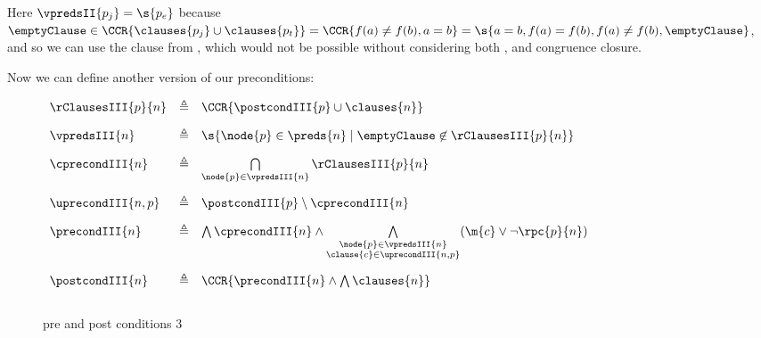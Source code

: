 Here $\vpredsII{p_j}=\s{p_e}$ because \\
$\emptyClause \in \CCR{\clauses{p_j} \cup \clauses{p_t}}=\CCR{f(a) \neq f(b),a=b} \\
=\s{a=b,f(a)=f(b),f(a) \neq f(b),\emptyClause}$,\\
 and so we can use the clause  from , which would not be possible without considering both ,  and congruence closure.



\noindent
Now we can define another version of our preconditions:
\begin{figure}[H]
$
\begin{array}{lll}
	\vspace{10pt}
	\rClausesIII{p}{n} & \triangleq & \CCR{\postcondIII{p} \cup \clauses{n}} \\
	\vspace{10pt}
	\vpredsIII{n}      & \triangleq & \s{\node{p} \in \preds{n} \mid  \emptyClause \not\in \rClausesIII{p}{n}} \\
	\vspace{10pt}
	\cprecondIII{n}   & \triangleq & \bigcap\limits_{\node{p} \in \vpredsIII{n}} \rClausesIII{p}{n} \\
	\vspace{10pt}
	\uprecondIII{n,p} & \triangleq & \postcondIII{p} \setminus \cprecondIII{n} \\
	\vspace{10pt}
	\precondIII{n}    & \triangleq & \bigwedge\cprecondIII{n} \wedge \bigwedge\limits_{\substack{\node{p} \in \vpredsIII{n}\\\clause{c} \in \uprecondIII{n,p}}} 
	(\m{c} \lor \lnot \rpc{p}{n})\\
	\vspace{10pt}
	\postcondIII{n} & \triangleq & \CCR{\precondIII{n} \land \bigwedge \clauses{n}}
\end{array}
$
\caption{pre and post conditions 3}
\label{prepost3}
\end{figure}

